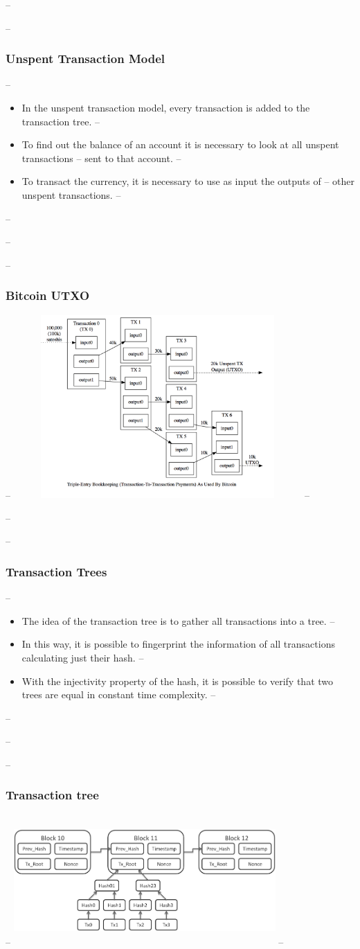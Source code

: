 \documentclass{beamer}
\begin{document}
-- \begin{frame}
--    \frametitle{Unspent Transaction Model}
--    \begin{itemize}[<+->]
--      \item In the unspent transaction model, every transaction is added to the transaction tree.
--      \item To find out the balance of an account it is necessary to look at all unspent transactions
--        sent to that account.
--      \item To transact the currency, it is necessary to use as input the outputs of
--        other unspent transactions.
--    \end{itemize}
-- \end{frame}

-- \begin{frame}
--   \frametitle{Bitcoin UTXO}
--     \includegraphics[width=11cm, height=7cm]{utxo}
-- \end{frame}

-- \begin{frame}
--    \frametitle{Transaction Trees}
--    \begin{itemize}[<+->]
--      \item The idea of the transaction tree is to gather all transactions into a tree.
--      \item In this way, it is possible to fingerprint the information of all transactions calculating just their hash.
--      \item With the injectivity property of the hash, it is possible to verify that two trees are equal in constant time complexity.
--    \end{itemize}
-- \end{frame}

-- \begin{frame}
--   \frametitle{Transaction tree}
--     \includegraphics[width=10cm, height=5cm]{blockchain}
-- \end{frame}
\end{document}
